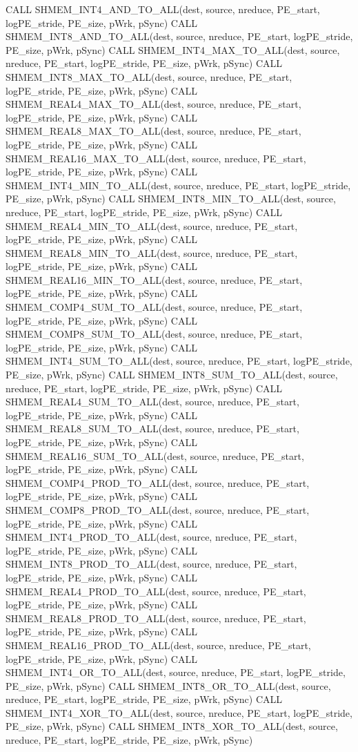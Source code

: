 CALL SHMEM_INT4_AND_TO_ALL(dest, source, nreduce, PE_start, logPE_stride, PE_size, pWrk, pSync)
CALL SHMEM_INT8_AND_TO_ALL(dest, source, nreduce, PE_start, logPE_stride, PE_size, pWrk, pSync)
CALL SHMEM_INT4_MAX_TO_ALL(dest, source, nreduce, PE_start, logPE_stride, PE_size, pWrk, pSync)
CALL SHMEM_INT8_MAX_TO_ALL(dest, source, nreduce, PE_start, logPE_stride, PE_size, pWrk, pSync)
CALL SHMEM_REAL4_MAX_TO_ALL(dest, source, nreduce, PE_start, logPE_stride, PE_size, pWrk, pSync)
CALL SHMEM_REAL8_MAX_TO_ALL(dest, source, nreduce, PE_start, logPE_stride, PE_size, pWrk, pSync)
CALL SHMEM_REAL16_MAX_TO_ALL(dest, source, nreduce, PE_start, logPE_stride, PE_size, pWrk, pSync)
CALL SHMEM_INT4_MIN_TO_ALL(dest, source, nreduce, PE_start, logPE_stride, PE_size, pWrk, pSync)
CALL SHMEM_INT8_MIN_TO_ALL(dest, source, nreduce, PE_start, logPE_stride, PE_size, pWrk, pSync)
CALL SHMEM_REAL4_MIN_TO_ALL(dest, source, nreduce, PE_start, logPE_stride, PE_size, pWrk, pSync)
CALL SHMEM_REAL8_MIN_TO_ALL(dest, source, nreduce, PE_start, logPE_stride, PE_size, pWrk, pSync)
CALL SHMEM_REAL16_MIN_TO_ALL(dest, source, nreduce, PE_start, logPE_stride, PE_size, pWrk, pSync)
CALL SHMEM_COMP4_SUM_TO_ALL(dest, source, nreduce, PE_start, logPE_stride, PE_size, pWrk, pSync)
CALL SHMEM_COMP8_SUM_TO_ALL(dest, source, nreduce, PE_start, logPE_stride, PE_size, pWrk, pSync)
CALL SHMEM_INT4_SUM_TO_ALL(dest, source, nreduce, PE_start, logPE_stride, PE_size, pWrk, pSync)
CALL SHMEM_INT8_SUM_TO_ALL(dest, source, nreduce, PE_start, logPE_stride, PE_size, pWrk, pSync)
CALL SHMEM_REAL4_SUM_TO_ALL(dest, source, nreduce, PE_start, logPE_stride, PE_size, pWrk, pSync)
CALL SHMEM_REAL8_SUM_TO_ALL(dest, source, nreduce, PE_start, logPE_stride, PE_size, pWrk, pSync)
CALL SHMEM_REAL16_SUM_TO_ALL(dest, source, nreduce, PE_start, logPE_stride, PE_size, pWrk, pSync)
CALL SHMEM_COMP4_PROD_TO_ALL(dest, source, nreduce, PE_start, logPE_stride, PE_size, pWrk, pSync)
CALL SHMEM_COMP8_PROD_TO_ALL(dest, source, nreduce, PE_start, logPE_stride, PE_size, pWrk, pSync)
CALL SHMEM_INT4_PROD_TO_ALL(dest, source, nreduce, PE_start, logPE_stride, PE_size, pWrk, pSync)
CALL SHMEM_INT8_PROD_TO_ALL(dest, source, nreduce, PE_start, logPE_stride, PE_size, pWrk, pSync)
CALL SHMEM_REAL4_PROD_TO_ALL(dest, source, nreduce, PE_start, logPE_stride, PE_size, pWrk, pSync)
CALL SHMEM_REAL8_PROD_TO_ALL(dest, source, nreduce, PE_start, logPE_stride, PE_size, pWrk, pSync)
CALL SHMEM_REAL16_PROD_TO_ALL(dest, source, nreduce, PE_start, logPE_stride, PE_size, pWrk, pSync)
CALL SHMEM_INT4_OR_TO_ALL(dest, source, nreduce, PE_start, logPE_stride, PE_size, pWrk, pSync)
CALL SHMEM_INT8_OR_TO_ALL(dest, source, nreduce, PE_start, logPE_stride, PE_size, pWrk, pSync)	
CALL SHMEM_INT4_XOR_TO_ALL(dest, source, nreduce, PE_start, logPE_stride, PE_size, pWrk, pSync)
CALL SHMEM_INT8_XOR_TO_ALL(dest, source, nreduce, PE_start, logPE_stride, PE_size, pWrk, pSync) %

